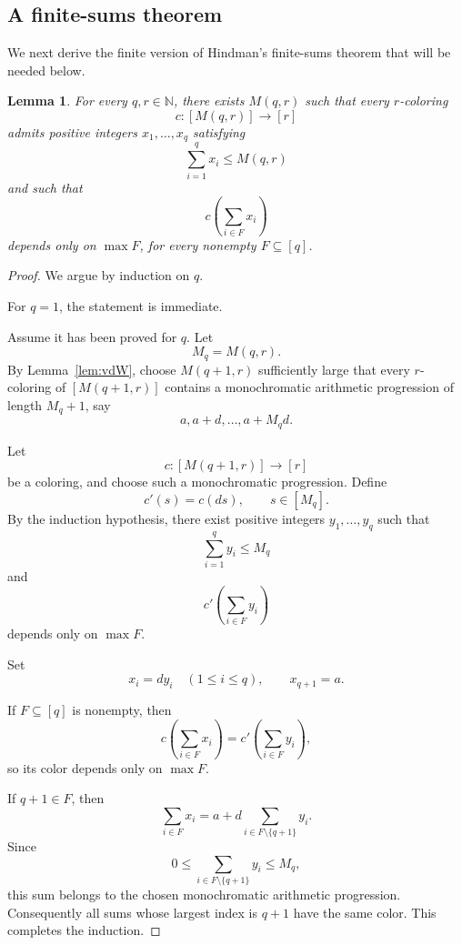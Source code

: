 \documentclass[11pt]{article}
\newtheorem{lemma}[theorem]{Lemma}
\newcommand{\N}{\mathbb N}
\begin{document}
\subsection{A finite-sums theorem}

We next derive the finite version of Hindman's finite-sums theorem
that will be needed below.

\begin{lemma}
  \label{lem:max-dependent}
  For every \(q,r\in\N\), there exists \(M(q,r)\) such that every
  \(r\)-coloring
  \[
    c:[M(q,r)]\longrightarrow[r]
  \]
  admits positive integers \(x_1,\dots,x_q\) satisfying
  \[
    \sum_{i=1}^q x_i\leq M(q,r)
  \]
  and such that
  \[
    c\left(\sum_{i\in F}x_i\right)
  \]
  depends only on \(\max F\), for every nonempty \(F\subseteq[q]\).
\end{lemma}

\begin{proof}
  We argue by induction on \(q\).

  For \(q=1\), the statement is immediate.

  Assume it has been proved for \(q\). Let
  \[
    M_q=M(q,r).
  \]
  By Lemma~\ref{lem:vdW}, choose \(M(q+1,r)\) sufficiently large that
  every \(r\)-coloring of \([M(q+1,r)]\) contains a monochromatic
  arithmetic progression of length \(M_q+1\), say
  \[
    a,a+d,\dots,a+M_qd.
  \]

  Let
  \[
    c:[M(q+1,r)]\longrightarrow[r]
  \]
  be a coloring, and choose such a monochromatic progression. Define
  \[
    c'(s)=c(ds),
    \qquad s\in[M_q].
  \]
  By the induction hypothesis, there exist positive integers
  \(y_1,\dots,y_q\) such that
  \[
    \sum_{i=1}^q y_i\leq M_q
  \]
  and
  \[
    c'\left(\sum_{i\in F}y_i\right)
  \]
  depends only on \(\max F\).

  Set
  \[
    x_i=dy_i
    \quad (1\leq i\leq q),
    \qquad
    x_{q+1}=a.
  \]

  If \(F\subseteq[q]\) is nonempty, then
  \[
    c\left(\sum_{i\in F}x_i\right)
    =
    c'\left(\sum_{i\in F}y_i\right),
  \]
  so its color depends only on \(\max F\).

  If \(q+1\in F\), then
  \[
    \sum_{i\in F}x_i
    =
    a+d\sum_{i\in F\setminus\{q+1\}}y_i.
  \]
  Since
  \[
    0\leq
    \sum_{i\in F\setminus\{q+1\}}y_i
    \leq M_q,
  \]
  this sum belongs to the chosen monochromatic arithmetic progression.
  Consequently all sums whose largest index is \(q+1\) have the same
  color. This completes the induction.
\end{proof}
\end{document}
